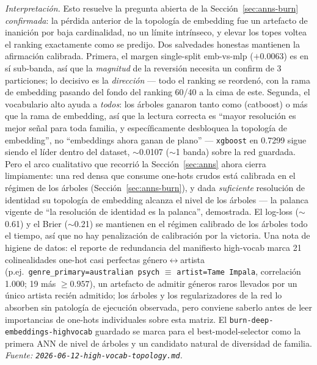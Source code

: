 \documentclass[11pt]{article}
\begin{document}
\emph{Interpretación.} Esto resuelve la pregunta abierta de la
Sección~\ref{sec:anns-burn} \emph{confirmada}: la pérdida anterior de la topología
de embedding fue un artefacto de inanición por baja cardinalidad, no un límite
intrínseco, y elevar los topes voltea el ranking exactamente como se predijo. Dos
salvedades honestas mantienen la afirmación calibrada. Primera, el margen
single-split emb-vs-mlp ($+0.0063$) es en sí sub-banda, así que la \emph{magnitud}
de la reversión necesita un confirm de 3 particiones; lo decisivo es la
\emph{dirección} --- todo el ranking se reordenó, con la rama de embedding pasando
del fondo del ranking 60/40 a la cima de este. Segunda, el vocabulario alto ayuda
a \emph{todos}: los árboles ganaron tanto como (catboost) o más que la rama de
embedding, así que la lectura correcta es ``mayor resolución es mejor señal para
toda familia, y específicamente desbloquea la topología de embedding'', no
``embeddings ahora ganan de plano'' --- \texttt{xgboost} en \num{0.7299} sigue
siendo el líder dentro del dataset, $\sim$\num{0.0107} ($\sim$1 banda) sobre la
red guardada. Pero el arco cualitativo que recorrió la Sección~\ref{sec:anns} ahora
cierra limpiamente: una red densa que consume one-hots crudos está calibrada en el
régimen de los árboles (Sección~\ref{sec:anns-burn}), y dada \emph{suficiente}
resolución de identidad su topología de embedding alcanza el nivel de los árboles
--- la palanca vigente de ``la resolución de identidad es la palanca'',
demostrada. El log-loss ($\sim$0.61) y el Brier ($\sim$0.21) se mantienen en el
régimen calibrado de los árboles todo el tiempo, así que no hay penalización de
calibración por la victoria. Una nota de higiene de datos: el reporte de
redundancia del manifiesto high-vocab marca 21 colinealidades one-hot casi
perfectas género$\leftrightarrow$artista (p.ej.\ \texttt{genre\_primary=australian
psych} $\equiv$ \texttt{artist=Tame Impala}, correlación \num{1.000}; 19 más
$\ge\num{0.957}$), un artefacto de admitir géneros raros llevados por un único
artista recién admitido; los árboles y los regularizadores de la red lo absorben
sin patología de ejecución observada, pero conviene saberlo antes de leer
importancias de one-hots individuales sobre esta matriz. El
\texttt{burn-deep-embeddings-highvocab} guardado se marca para el
best-model-selector como la primera ANN de nivel de árboles y un candidato natural
de diversidad de familia.
\emph{Fuente: \texttt{2026-06-12-high-vocab-topology.md}.}
\end{document}
